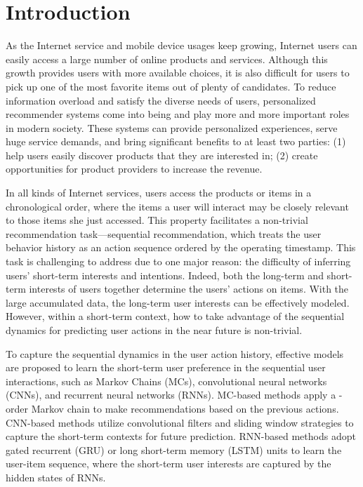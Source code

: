 \documentclass[sigconf]{acmart}
\begin{document}


\maketitle

\section{Introduction}
As the Internet service and mobile device usages keep growing, Internet users can easily access a large number of online products and services. Although this growth provides users with more available choices, it is also difficult for users to pick up one of the most favorite items out of plenty of candidates. To reduce information overload and satisfy the diverse needs of users, personalized recommender systems come into being and play more and more important roles in modern society. These systems can provide personalized experiences, serve huge service demands, and bring significant benefits to at least two parties: (1) help users easily discover products that they are interested in; (2) create opportunities for product providers to increase the revenue.

In all kinds of Internet services, users access the products or items in a chronological order, where the items a user will interact may be closely relevant to those items she just accessed. This property facilitates a non-trivial recommendation task---sequential recommendation, which treats the user behavior history as an action sequence ordered by the operating timestamp. This task is challenging to address due to one major reason: the difficulty of inferring users' short-term interests and intentions. Indeed, both the long-term and short-term interests of users together determine the users' actions on items. With the large accumulated data, the long-term user interests can be effectively modeled. However, within a short-term context, how to take advantage of the sequential dynamics for predicting user actions in the near future is non-trivial.

To capture the sequential dynamics in the user action history, effective models are proposed to learn the short-term user preference in the sequential user interactions, such as Markov Chains (MCs), convolutional neural networks (CNNs), and recurrent neural networks (RNNs). MC-based methods \cite{DBLP:conf/www/RendleFS10,DBLP:conf/icdm/HeM16} apply a -order Markov chain to make recommendations based on the  previous actions. CNN-based methods \cite{DBLP:conf/wsdm/TangW18} utilize convolutional filters and sliding window strategies to capture the short-term contexts for future prediction. RNN-based methods \cite{DBLP:journals/corr/HidasiKBT15,DBLP:conf/recsys/QuadranaKHC17,DBLP:conf/cikm/HidasiK18} adopt gated recurrent (GRU) or long short-term memory (LSTM) units to learn the user-item sequence, where the short-term user interests are captured by the hidden states of RNNs.
\end{document}
